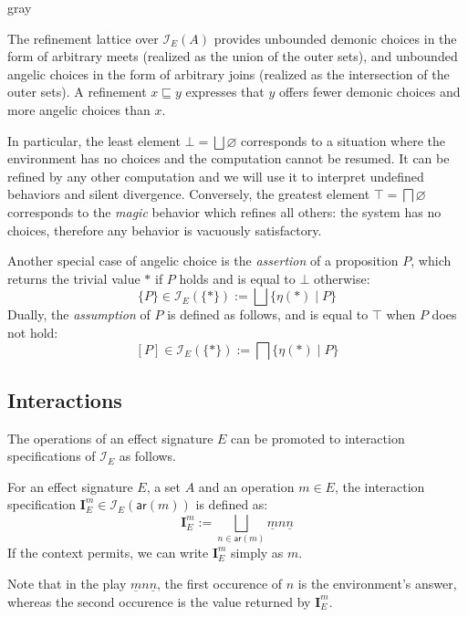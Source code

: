 \documentclass[sigplan,10pt,review,anonymous]{acmart}
\newcommand{\kw}[1]{\ensuremath{ \mathsf{#1} }}
\begin{document}
\begin{color}{gray}

The refinement lattice over $\mathcal{I}_E(A)$
provides unbounded demonic choices
in the form of arbitrary meets
(realized as the union of the outer sets),
and unbounded angelic choices
in the form of arbitrary joins
(realized as the intersection of the outer sets).
A refinement $x \sqsubseteq y$ expresses that
$y$ offers fewer demonic choices and more angelic choices than $x$.

In particular,
the least element $\bot = \bigsqcup \varnothing$
corresponds to a situation where the environment has no choices
and the computation cannot be resumed.
It can be refined by any other computation and
we will use it to interpret undefined behaviors and silent divergence.
Conversely,
the greatest element $\top = \bigsqcap \varnothing$
corresponds to the \emph{magic} behavior
which refines all others:
the system has no choices,
therefore any behavior is vacuously satisfactory.

Another special case of angelic choice is
the \emph{assertion} of a proposition $P$,
which returns the trivial value $*$ if $P$ holds
and is equal to $\bot$ otherwise:
\[ \{P\} \in \mathcal{I}_E(\{*\}) :=
    \bigsqcup \{ \eta(*) \mid P \} \]
Dually,
the \emph{assumption} of $P$
is defined as follows,
and is equal to $\top$ when $P$ does not hold:
\[ [P] \in \mathcal{I}_E(\{*\}) :=
    \bigsqcap \{ \eta(*) \mid P \} \]

\end{color}


\subsection{Interactions} %

The operations of an effect signature $E$
can be promoted to interaction specifications of $\mathcal{I}_E$
as follows.

\begin{definition}
For an effect signature $E$, a set $A$ and
an operation $m \in E$,
the interaction specification
$\mathbf{I}_E^m \in \mathcal{I}_E(\kw{ar}(m))$
is defined as:
\[
  \mathbf{I}_E^m :=
    \bigsqcup_{n \in \kw{ar}(m)} \underline{m} n \underline{n}
\]
If the context permits,
we can write $\mathbf{I}_E^m$ simply as $m$.
\end{definition}
Note that in the play $\underline{m} n \underline{n}$,
the first occurence of $n$ is the environment's answer,
whereas the second occurence is the value returned by $\mathbf{I}_E^m$.
\end{document}
